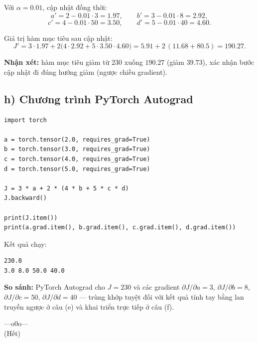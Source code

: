 \documentclass[a4paper,12pt]{article}
\begin{document}
Với $\alpha = 0.01$, cập nhật đồng thời:
\[ a' = 2 - 0.01\cdot 3 = 1.97, \qquad b' = 3 - 0.01\cdot 8 = 2.92, \]
\[ c' = 4 - 0.01\cdot 50 = 3.50, \qquad d' = 5 - 0.01\cdot 40 = 4.60. \]

Giá trị hàm mục tiêu sau cập nhật:
\[ J' = 3\cdot 1.97 + 2\bigl(4\cdot 2.92 + 5\cdot 3.50\cdot 4.60\bigr)
      = 5.91 + 2\,(11.68 + 80.5) = 190.27. \]

\textbf{Nhận xét:} hàm mục tiêu giảm từ $230$ xuống $190.27$ (giảm $39.73$), xác nhận bước
cập nhật đi đúng hướng giảm (ngược chiều gradient).

\subsection*{h) Chương trình PyTorch Autograd}

\begin{verbatim}
import torch

a = torch.tensor(2.0, requires_grad=True)
b = torch.tensor(3.0, requires_grad=True)
c = torch.tensor(4.0, requires_grad=True)
d = torch.tensor(5.0, requires_grad=True)

J = 3 * a + 2 * (4 * b + 5 * c * d)
J.backward()

print(J.item())
print(a.grad.item(), b.grad.item(), c.grad.item(), d.grad.item())
\end{verbatim}

Kết quả chạy:

\begin{verbatim}
230.0
3.0 8.0 50.0 40.0
\end{verbatim}

\textbf{So sánh:} PyTorch Autograd cho $J = 230$ và các gradient
$\partial J/\partial a = 3$, $\partial J/\partial b = 8$, $\partial J/\partial c = 50$,
$\partial J/\partial d = 40$ — trùng khớp tuyệt đối với kết quả tính tay bằng
lan truyền ngược ở câu (e) và khai triển trực tiếp ở câu (f).

\begin{center}
---o0o--- \\[0.3cm]
(Hết)
\end{center}
\end{document}
